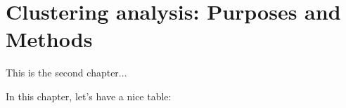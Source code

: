 \chapter{Clustering analysis: Purposes and Methods}

This is the second chapter...

In this chapter, let's have a nice table:

